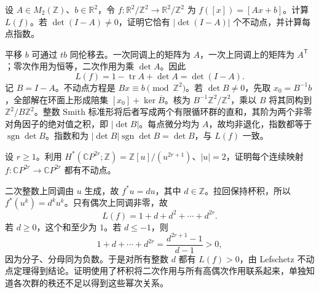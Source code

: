 \begin{exercise}\label{g2:ex:torus-affine-lefschetz}
	设 \(A\in M_2(\mathbb Z)\)、\(b\in\mathbb R^2\)，令 \(f:\mathbb R^2/\mathbb Z^2\to\mathbb R^2/\mathbb Z^2\) 为 \(f([x])=[Ax+b]\)。计算 \(L(f)\)。若 \(\det(I-A)\ne0\)，证明它恰有 \(|\det(I-A)|\) 个不动点，并计算每点指数。
\end{exercise}
\begin{solution}
	平移 \(b\) 可通过 \(tb\) 同伦移去。一次同调上的矩阵为 \(A\)，一次上同调上的矩阵为 \(A^{\mathsf T}\)；零次作用为恒等，二次作用为乘 \(\det A\)。因此
	\[
		L(f)=1-\operatorname{tr}A+\det A=\det(I-A).
	\]
	记 \(B=I-A\)。不动点方程是 \(Bx\equiv b\pmod{\mathbb Z^2}\)。若 \(\det B\ne0\)，先取 \(x_0=B^{-1}b\)，全部解在环面上形成陪集 \([x_0]+\ker\overline B\)。核为 \(B^{-1}\mathbb Z^2/\mathbb Z^2\)，乘以 \(B\) 将其同构到 \(\mathbb Z^2/B\mathbb Z^2\)。整数 Smith 标准形将后者写成两个有限循环群的直和，其阶为两个非零对角因子的绝对值之积，即 \(|\det B|\)。每点微分均为 \(A\)，故均非退化，指数都等于 \(\operatorname{sgn}\det B\)。指数和为 \(|\det B|\operatorname{sgn}\det B=\det B\)，与 \(L(f)\) 一致。
\end{solution}

\begin{exercise}\label{g2:ex:even-complex-projective-fixed-point}
	设 \(r\geq1\)。利用 \(H^*(\mathbb CP^{2r};\mathbb Z)=\mathbb Z[u]/(u^{2r+1})\)、\(|u|=2\)，证明每个连续映射 \(f:\mathbb CP^{2r}\to\mathbb CP^{2r}\) 都有不动点。\cite[第2.C节，The Lefschetz Fixed Point Theorem]{Hatcher2002}
\end{exercise}
\begin{solution}
	二次整数上同调由 \(u\) 生成，故 \(f^*u=du\)，其中 \(d\in\mathbb Z\)。拉回保持杯积，所以 \(f^*(u^k)=d^ku^k\)。只有偶次上同调非零，故
	\[
		L(f)=1+d+d^2+\cdots+d^{2r}.
	\]
	若 \(d\geq0\)，这个和至少为 \(1\)。若 \(d\leq-1\)，则
	\[
		1+d+\cdots+d^{2r}=\frac{d^{2r+1}-1}{d-1}>0,
	\]
	因为分子、分母同为负数。于是对所有整数 \(d\) 都有 \(L(f)>0\)，由 Lefschetz 不动点定理得到结论。证明使用了杯积将二次作用与所有高偶次作用联系起来，单独知道各次群的秩还不足以得到这些幂次关系。
\end{solution}

